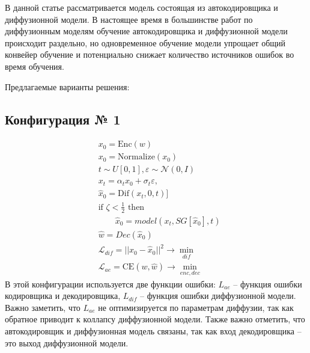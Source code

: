 \documentclass[12pt,a4paper]{article}
\begin{document}
В данной статье рассматривается модель состоящая из автокодировщика и диффузионной модели. В настоящее время в большинстве работ по диффузионным моделям обучение автокодировщика и диффузионной модели происходит раздельно, но одновременное обучение модели упрощает общий конвейер обучение и потенциально снижает количество источников ошибок во время обучения.

Предлагаемые варианты решения:

\subsection{Конфигурация № 1}
\begin{align} 
& x_0 = \text{Enc}(w) \\
& x_0 = \text{Normalize}(x_0) \\
& t \sim U[0, 1], \varepsilon \sim \mathcal{N}(0, I)\\ 
& x_t = \alpha_t x_0 + \sigma_t \varepsilon, \\
& \hat{x}_0 = \text{Dif}(x_t, 0, t)] \\
& \text{if }\zeta < \frac{1}{2} \text{ then } \\
& \qquad \hat{x}_0 = model(x_t, SG[\hat{x}_0], t) \\
& \hat{w} = Dec(\hat{x}_0)\\
& \mathcal{L}_{dif} = ||x_0 - \hat{x}_0||^2 \rightarrow \min_{dif} \\
& \mathcal{L}_{ae} = \text{CE}(w, \hat{w}) \rightarrow \min_{enc, dec}
\end{align} 
В этой конфигурации используется две функции ошибки: $L_{ae}$ -- функция ошибки кодировщика и декодировщика, $L_{dif}$ -- функция ошибки диффузионной модели.
Важно заметить, что $L_{ae}$ не оптимизируется по параметрам диффузии, так как обратное приводит к коллапсу диффузионной модели. Также важно отметить, что автокодировщик и диффузионная модель связаны, так как вход декодировщика -- это выход диффузионной модели.
\end{document}

